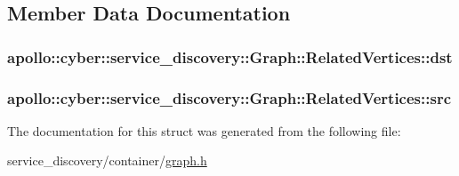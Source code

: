 \subsection{Member Data Documentation}
\hypertarget{structapollo_1_1cyber_1_1service__discovery_1_1Graph_1_1RelatedVertices_a1c4fcacd9c6e4fa1c6ed7949bbae684a}{
\subsubsection[{dst}]{ apollo\-::cyber\-::service\-\_\-discovery\-::\-Graph\-::\-Related\-Vertices\-::dst}}\label{structapollo_1_1cyber_1_1service__discovery_1_1Graph_1_1RelatedVertices_a1c4fcacd9c6e4fa1c6ed7949bbae684a}
\hypertarget{structapollo_1_1cyber_1_1service__discovery_1_1Graph_1_1RelatedVertices_a494b12998fc985c55a5c384fc58de21d}{
\subsubsection[{src}]{ apollo\-::cyber\-::service\-\_\-discovery\-::\-Graph\-::\-Related\-Vertices\-::src}}\label{structapollo_1_1cyber_1_1service__discovery_1_1Graph_1_1RelatedVertices_a494b12998fc985c55a5c384fc58de21d}


The documentation for this struct was generated from the following file\-:\begin{DoxyCompactItemize}
\item 
service\-\_\-discovery/container/\hyperlink{graph_8h}{graph.\-h}\end{DoxyCompactItemize}
